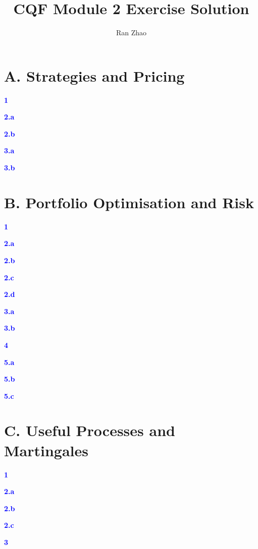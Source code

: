 \documentclass[a4paper,11pt] {article}
\author{Ran Zhao}
\title{CQF Module 2 Exercise Solution}
\date{}
\begin{document}
\maketitle


\section*{A. Strategies and Pricing}
\textcolor{blue}{\bf 1 }

\textcolor{blue}{\bf 2.a }

\textcolor{blue}{\bf 2.b }

\textcolor{blue}{\bf 3.a }

\textcolor{blue}{\bf 3.b }

\section*{B. Portfolio Optimisation and Risk}
\textcolor{blue}{\bf 1 }

\textcolor{blue}{\bf 2.a }

\textcolor{blue}{\bf 2.b }

\textcolor{blue}{\bf 2.c }

\textcolor{blue}{\bf 2.d }

\textcolor{blue}{\bf 3.a }

\textcolor{blue}{\bf 3.b }

\textcolor{blue}{\bf 4 }

\textcolor{blue}{\bf 5.a }

\textcolor{blue}{\bf 5.b }

\textcolor{blue}{\bf 5.c }

\section*{C. Useful Processes and Martingales}
\textcolor{blue}{\bf 1 }

\textcolor{blue}{\bf 2.a }

\textcolor{blue}{\bf 2.b }

\textcolor{blue}{\bf 2.c }

\textcolor{blue}{\bf 3 }

%
\end{document}
